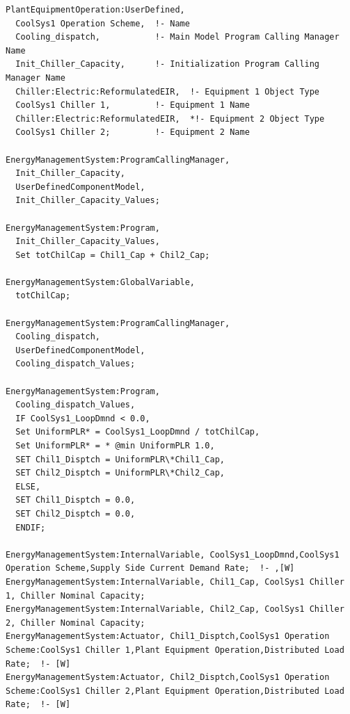 \begin{lstlisting}
PlantEquipmentOperation:UserDefined,
  CoolSys1 Operation Scheme,  !- Name
  Cooling_dispatch,           !- Main Model Program Calling Manager Name
  Init_Chiller_Capacity,      !- Initialization Program Calling Manager Name
  Chiller:Electric:ReformulatedEIR,  !- Equipment 1 Object Type
  CoolSys1 Chiller 1,         !- Equipment 1 Name
  Chiller:Electric:ReformulatedEIR,  *!- Equipment 2 Object Type
  CoolSys1 Chiller 2;         !- Equipment 2 Name

EnergyManagementSystem:ProgramCallingManager,
  Init_Chiller_Capacity,
  UserDefinedComponentModel,
  Init_Chiller_Capacity_Values;

EnergyManagementSystem:Program,
  Init_Chiller_Capacity_Values,
  Set totChilCap = Chil1_Cap + Chil2_Cap;

EnergyManagementSystem:GlobalVariable,
  totChilCap;

EnergyManagementSystem:ProgramCallingManager,
  Cooling_dispatch,
  UserDefinedComponentModel,
  Cooling_dispatch_Values;

EnergyManagementSystem:Program,
  Cooling_dispatch_Values,
  IF CoolSys1_LoopDmnd < 0.0,
  Set UniformPLR* = CoolSys1_LoopDmnd / totChilCap,
  Set UniformPLR* = * @min UniformPLR 1.0,
  SET Chil1_Disptch = UniformPLR\*Chil1_Cap,
  SET Chil2_Disptch = UniformPLR\*Chil2_Cap,
  ELSE,
  SET Chil1_Disptch = 0.0,
  SET Chil2_Disptch = 0.0,
  ENDIF;

EnergyManagementSystem:InternalVariable, CoolSys1_LoopDmnd,CoolSys1 Operation Scheme,Supply Side Current Demand Rate;  !- ,[W]
EnergyManagementSystem:InternalVariable, Chil1_Cap, CoolSys1 Chiller 1, Chiller Nominal Capacity;
EnergyManagementSystem:InternalVariable, Chil2_Cap, CoolSys1 Chiller 2, Chiller Nominal Capacity;
EnergyManagementSystem:Actuator, Chil1_Disptch,CoolSys1 Operation Scheme:CoolSys1 Chiller 1,Plant Equipment Operation,Distributed Load Rate;  !- [W]
EnergyManagementSystem:Actuator, Chil2_Disptch,CoolSys1 Operation Scheme:CoolSys1 Chiller 2,Plant Equipment Operation,Distributed Load Rate;  !- [W]
\end{lstlisting}
